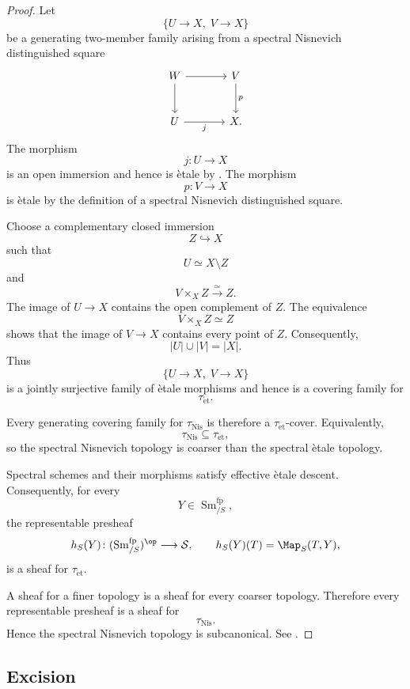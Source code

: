 \begin{proof}
Let
\[
    \{U\to X,\;V\to X\}
\]
be a generating two-member family arising from a spectral Nisnevich
distinguished square
\[
\begin{tikzcd}[column sep=large, row sep=large]
    W
        \arrow[r]
        \arrow[d]
    &
    V
        \arrow[d, "p"]
    \\
    U
        \arrow[r, "j"']
    &
    X.
\end{tikzcd}
\]
The morphism
\[
    j
    \colon
    U
    \longrightarrow
    X
\]
is an open immersion and hence is \`etale by
. The morphism
\[
    p
    \colon
    V
    \longrightarrow
    X
\]
is \`etale by the definition of a spectral Nisnevich distinguished
square.

Choose a complementary closed immersion
\[
    Z
    \hookrightarrow
    X
\]
such that
\[
    U
    \simeq
    X\setminus Z
\]
and
\[
    V\times_XZ
    \xrightarrow{\simeq}
    Z.
\]
The image of \(U\to X\) contains the open complement of \(Z\). The
equivalence
\[
    V\times_XZ
    \simeq
    Z
\]
shows that the image of \(V\to X\) contains every point of \(Z\).
Consequently,
\[
    |U|\cup|V|
    =
    |X|.
\]
Thus
\[
    \{U\to X,\;V\to X\}
\]
is a jointly surjective family of \`etale morphisms and hence is a
covering family for
\[
    \tau_{\mathrm{\acute et}}.
\]

Every generating covering family for
\(\tau_{\mathrm{Nis}}\) is therefore a
\(\tau_{\mathrm{\acute et}}\)-cover. Equivalently,
\[
    \tau_{\mathrm{Nis}}
    \subseteq
    \tau_{\mathrm{\acute et}},
\]
so the spectral Nisnevich topology is coarser than the spectral
\`etale topology.

Spectral schemes and their morphisms satisfy effective \`etale descent.
Consequently, for every
\[
    Y
    \in
    \operatorname{Sm}^{\mathrm{fp}}_{/S},
\]
the representable presheaf
\[
    h_S(Y)
    \colon
    (\operatorname{Sm}^{\mathrm{fp}}_{/S})^{\op}
    \longrightarrow
    \mathcal S,
    \qquad
    h_S(Y)(T)
    =
    \Map_S(T,Y),
\]
is a sheaf for
\(\tau_{\mathrm{\acute et}}\).

A sheaf for a finer topology is a sheaf for every coarser topology.
Therefore every representable presheaf is a sheaf for
\[
    \tau_{\mathrm{Nis}}.
\]
Hence the spectral Nisnevich topology is subcanonical. See
\cite{LurieSAG,KhanBraveNewMotivicI}.
\end{proof}

\subsection{Excision}

